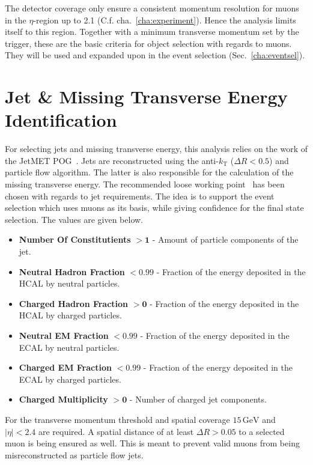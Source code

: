The detector coverage only ensure a consistent momentum resolution for muons in the $\eta$-region up to 2.1 (C.f. cha.~\ref{cha:experiment}). Hence the analysis limits itself to this region. Together with a minimum transverse momentum set by the trigger, these are the basic criteria for object selection with regards to muons. They will be used and expanded upon in the event selection (Sec.~\ref{cha:eventsel}). 


\section{Jet \& Missing Transverse Energy Identification}
\label{sec:jetid}

For selecting jets and missing transverse energy, this analysis relies on the work of the JetMET POG~\cite{jmepog}. Jets are reconstructed using the anti-$k_{\text{T}}$ ($\Delta R < 0.5$) and particle flow algorithm. The latter is also responsible for the calculation of the missing transverse energy. The recommended loose working point~\cite{jetid, jetidpf} has been chosen with regards to jet requirements. The idea is to support the event selection which uses muons as its basis, while giving confidence for the final state selection. The values are given below.

\begin{itemize}
\item \textbf{Number Of Constitutients} $\mathbf{> 1}$ - Amount of particle components of the jet.
\item \textbf{Neutral Hadron Fraction} $\mathbf{< 0.99}$ - Fraction of the energy deposited in the HCAL by neutral particles.
\item \textbf{Charged Hadron Fraction} $\mathbf{> 0}$ - Fraction of the energy deposited in the HCAL by charged particles.
\item \textbf{Neutral EM Fraction} $\mathbf{< 0.99}$ - Fraction of the energy deposited in the ECAL by neutral particles.
\item \textbf{Charged EM Fraction} $\mathbf{< 0.99}$ - Fraction of the energy deposited in the ECAL by charged particles.
\item \textbf{Charged Multiplicity} $\mathbf{> 0}$ - Number of charged jet components.
\end{itemize}

For the transverse momentum threshold and spatial coverage $15\,\text{GeV}$ and $|\eta|  < 2.4$ are required. A spatial distance of at least $\Delta R > 0.05$ to a selected muon is being ensured as well. This is meant to prevent valid muons from being misreconstructed as particle flow jets. 

